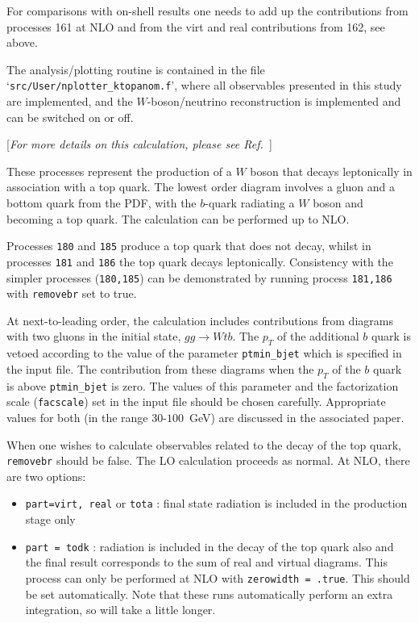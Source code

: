 For comparisons with on-shell results one needs to add up the contributions
from processes 161 at NLO and from the virt and real contributions from 162, see above.

The analysis/plotting routine is contained in the file
`\texttt{src/User/nplotter\_ktopanom.f}', where all observables
presented in this study are implemented, and the $W$-boson/neutrino
reconstruction is implemented and can be switched on or off.

\label{subsec:wt}

\begin{center}
[{\it For more details on this calculation, please see Ref.~\cite{Campbell:2005bb}}]
\end{center}

These processes represent the production of a $W$ boson that decays leptonically
in association with a top quark. The lowest order diagram involves a gluon and
a bottom quark from the PDF, with the $b$-quark radiating a $W$ boson and
becoming a top quark. The calculation can be performed up to NLO.

Processes {\tt 180} and {\tt 185} produce a top quark that does not decay,
whilst in processes {\tt 181} and {\tt 186} the top quark decays leptonically.
Consistency with
the simpler processes ({\tt 180,185}) can be demonstrated by running process
{\tt 181,186} with {\tt removebr} set to true.

At next-to-leading order, the calculation includes contributions from diagrams
with two gluons in the initial state, $gg \rightarrow Wtb$. The $p_T$ of the
additional $b$ quark is vetoed according to the value of the parameter
{\tt ptmin\_bjet} which is specified in the input file. The contribution from
these diagrams when the $p_T$ of the $b$ quark is above {\tt ptmin\_bjet}
is zero. The values of this parameter and the factorization scale ({\tt facscale})
set in the input file should be chosen carefully. Appropriate values for both
(in the range $30$-$100$~GeV) are discussed in the associated paper.

When one wishes to calculate observables related to the decay of the top
quark, {\tt removebr} should be false.
The LO calculation proceeds as normal. At NLO, there are two options:
\begin{itemize}
\item {\tt part=virt, real} or {\tt tota} : final state radiation is included
in the production stage only
\item {\tt part = todk} : radiation is included in the decay of the top
quark also and the final result corresponds to the sum of real and virtual
diagrams. This process can only be performed at NLO with 
{\tt zerowidth = .true}. This should be set automatically.
Note that these runs automatically perform an extra integration, so
will take a little longer.
\end{itemize}

